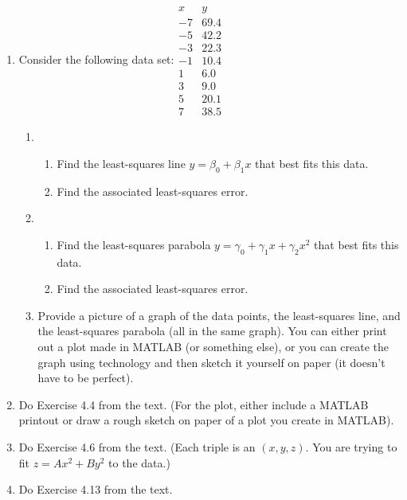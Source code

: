 \documentclass{article}
\newcommand{\0}{\mathbf{0}}
\begin{document}
\begin{enumerate}
	\item Consider the following data set:\qquad $\begin{array}{r|r}
	x & y\\
	\hline
	-7 & 69.4\\
	-5 & 42.2\\
	-3 & 22.3\\
	-1 & 10.4\\
	1 & 6.0\\
	3 & 9.0\\
	5 & 20.1\\
	7 & 38.5
	\end{array}$
	\begin{enumerate}
		\item \begin{enumerate}
			\item Find the least-squares line $y = \beta_0 + \beta_1 x$ that best fits this data.
			\item Find the associated least-squares error.
		\end{enumerate}
		\item \begin{enumerate}
			\item Find the least-squares parabola $y = \gamma_0 + \gamma_1 x + \gamma_2 x^2$ that best fits this data.
			\item Find the associated least-squares error.
		\end{enumerate}
		\item Provide a picture of a graph of the data points, the least-squares line, and the least-squares parabola (all in the same graph).  You can either print out a plot made in MATLAB (or something else), or you can create the graph using technology and then sketch it yourself on paper (it doesn't have to be perfect).
	\end{enumerate}

	\item Do Exercise 4.4 from the text.  (For the plot, either include a MATLAB printout or draw a rough sketch on paper of a plot you create in MATLAB).
	
	\item Do Exercise 4.6 from the text.  (Each triple is an $(x,y,z)$.  You are trying to fit $z = Ax^2 + By^2$ to the data.)
	

	
	\item Do Exercise 4.13 from the text.

\end{enumerate}
\end{document}
